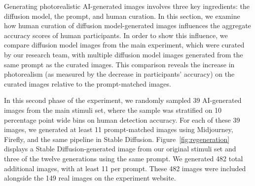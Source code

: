 \begin{figure*}[h]
\centering
\captionsetup{justification=raggedright, singlelinecheck=false, skip=2pt}
\begin{subfigure}[t]{0.48\textwidth}  
\subcaption{}
\end{subfigure}
\hfill
\begin{subfigure}[t]{0.48\textwidth}
\subcaption{}
\end{subfigure}
\caption{ }
\label{fig:curation-value}
\end{figure*}

Generating photorealistic AI-generated images involves three key ingredients: the diffusion model, the prompt, and human curation. In this section, we examine how human curation of diffusion model-generated images influences the aggregate accuracy scores of human participants. In order to show this influence, we compare diffusion model images from the main experiment, which were curated by our research team, with multiple diffusion model images generated from the same prompt as the curated images. This comparison reveals the increase in photorealism (as measured by the decrease in participants' accuracy) on the curated images relative to the prompt-matched images.

In this second phase of the experiment, we randomly sampled 39 AI-generated images from the main stimuli set, where the sample was stratified on 10 percentage point wide bins on human detection accuracy. For each of these 39 images, we generated at least 11 prompt-matched images using Midjourney, Firefly, and the same pipeline in Stable Diffusion. Figure~\ref{fig:regeneration} displays a Stable Diffusion-generated image from our original stimuli set and three of the twelve generations using the same prompt. We generated 482 total additional images, with at least 11 per prompt. These 482 images were included alongside the 149 real images on the experiment website.

